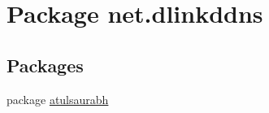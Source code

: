 \hypertarget{namespacenet_1_1dlinkddns}{}\section{Package net.\+dlinkddns}
\label{namespacenet_1_1dlinkddns}
\subsection*{Packages}
\begin{DoxyCompactItemize}
\item 
package \mbox{\hyperlink{namespacenet_1_1dlinkddns_1_1atulsaurabh}{atulsaurabh}}
\end{DoxyCompactItemize}
